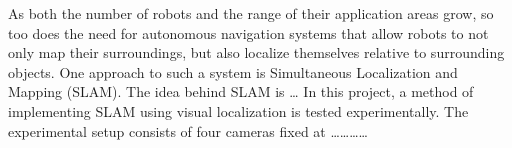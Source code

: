 As both the number of robots and the range of their application areas grow, so too does the need for autonomous navigation systems that allow robots to not only map their surroundings, but also localize themselves relative to surrounding objects. 
One approach to such a system is Simultaneous Localization and Mapping (SLAM).
The idea behind SLAM is \ldots
In this project, a method of implementing SLAM using visual localization is tested experimentally. The experimental setup consists of four cameras fixed at \ldots\ldots\ldots\ldots
